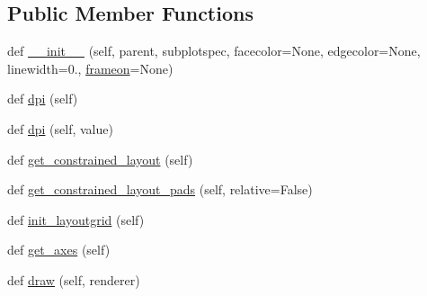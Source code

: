 \subsection*{Public Member Functions}
\begin{DoxyCompactItemize}
\item 
def \hyperlink{classmatplotlib_1_1figure_1_1SubFigure_a41a31b7d57b06a54e19f70f17904fd31}{\+\_\+\+\_\+init\+\_\+\+\_\+} (self, parent, subplotspec, facecolor=None, edgecolor=None, linewidth=0., \hyperlink{classmatplotlib_1_1figure_1_1FigureBase_a11123dc5aa23e7190a0c4c154430c989}{frameon}=None)
\item 
def \hyperlink{classmatplotlib_1_1figure_1_1SubFigure_a36bc49dcf866989ca720f851beca8ae4}{dpi} (self)
\item 
def \hyperlink{classmatplotlib_1_1figure_1_1SubFigure_a6fbfcdcf8c3fc1f3d58642dcf5aaa77d}{dpi} (self, value)
\item 
def \hyperlink{classmatplotlib_1_1figure_1_1SubFigure_a3fc01e200180239173d3f3985ca9e817}{get\+\_\+constrained\+\_\+layout} (self)
\item 
def \hyperlink{classmatplotlib_1_1figure_1_1SubFigure_ab51b41aafe2a90beabaffec591f2f87e}{get\+\_\+constrained\+\_\+layout\+\_\+pads} (self, relative=False)
\item 
def \hyperlink{classmatplotlib_1_1figure_1_1SubFigure_aaf2b21d5b97d23345727b7ed49c6c165}{init\+\_\+layoutgrid} (self)
\item 
def \hyperlink{classmatplotlib_1_1figure_1_1SubFigure_ad68fb8445ae699f76a7e98b6e60b4aa4}{get\+\_\+axes} (self)
\item 
def \hyperlink{classmatplotlib_1_1figure_1_1SubFigure_a6760ec6420a660df48f63aa087589c58}{draw} (self, renderer)
\end{DoxyCompactItemize}
